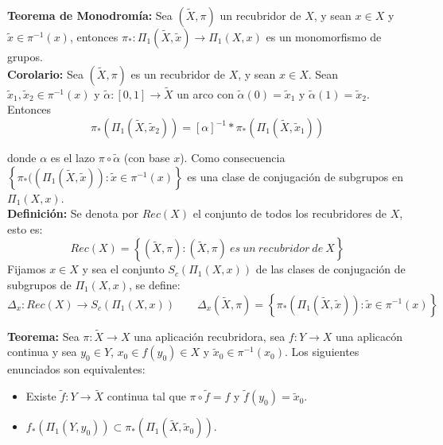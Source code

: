 \documentclass{article}
\begin{document}
\textbf{Teorema de Monodromía:} Sea $(\tilde{X},\pi)$ un recubridor de $X$, y sean $x\in X$ y $\tilde{x}\in \pi^{-1}(x)$, entonces $\pi_*:\Pi_1(\tilde{X},\tilde{x})\rightarrow \Pi_1(X,x)$ es un monomorfismo de grupos.\\

\textbf{Corolario:} Sea $(\tilde{X},\pi)$ es un recubridor de $X$, y sean $x\in X$. Sean $\tilde{x}_1,\tilde{x}_2\in \pi^{-1}(x)$ y $\tilde{\alpha}:[0,1]\rightarrow \tilde{X}$ un arco con $\tilde{\alpha}(0)=\tilde{x}_1$ y $\tilde{\alpha}(1)=\tilde{x}_2$. Entonces
\begin{equation*}
\pi_*\left(\Pi_1(\tilde{X},\tilde{x}_2)\right)=[\alpha]^{-1}*\pi_*\left(\Pi_1(\tilde{X},\tilde{x}_1)\right)
\end{equation*}

donde $\alpha$ es el lazo $\pi\circ \tilde{\alpha}$ (con base $x$). Como consecuencia $\left\lbrace \pi_*(\left(\Pi_1(\tilde{X},\tilde{x})\right):\tilde{x}\in \pi^{-1}(x)\right\rbrace$ es una clase de conjugación de subgrupos en $\Pi_1(X,x)$.\\

\textbf{Definición:} Se denota por $Rec(X)$ el conjunto de todos los recubridores de $X$, esto es:
\begin{equation*}
Rec(X)=\left\lbrace(\tilde{X},\pi):(\tilde{X},\pi)\:es\:un\:recubridor\:de\:X\right\rbrace
\end{equation*}
Fijamos $x\in X$ y sea el conjunto $S_c\left(\Pi_1(X,x)\right)$ de las clases de conjugación de subgrupos de $\Pi_1(X,x)$, se define:
\begin{equation*}
\Delta_x:Rec(X)\rightarrow S_c(\Pi_1(X,x))\qquad \Delta_x(\tilde{X},\pi)=\left\lbrace\pi_*(\Pi_1(\tilde{X},\tilde{x})):\tilde{x}\in \pi^{-1}(x)\right\rbrace
\end{equation*}

\textbf{Teorema:} Sea $\pi:\tilde{X}\rightarrow X$ una aplicación recubridora, sea $f:Y\rightarrow X$ una aplicacón continua y sea $y_0\in Y$, $x_0\in f(y_0)\in X$ y $\tilde{x}_0\in \pi^{-1}(x_0)$. Los siguientes enunciados son equivalentes:
\begin{itemize}
\item Existe $\tilde{f}:Y\rightarrow \tilde{X}$ continua tal que $\pi\circ \tilde{f}=f$ y $\tilde{f}(y_0)=\tilde{x}_0$.

\item $f_*(\Pi_1(Y,y_0))\subset \pi_*(\Pi_1(\tilde{X},\tilde{x}_0))$. 
\end{itemize}
\end{document}
